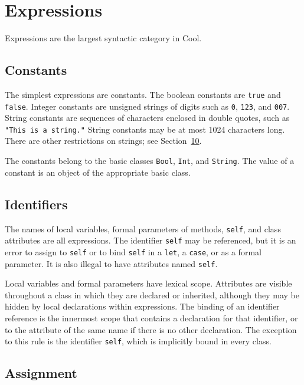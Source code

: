 \documentclass[]{article}
\begin{document}
\section{Expressions}

Expressions are the largest syntactic category in Cool. \\


\subsection{Constants}

The simplest expressions are constants. The boolean constants are
\texttt{true} and \texttt{false}. Integer constants are unsigned strings
of digits such as \texttt{0}, \texttt{123}, and \texttt{007}. String
constants are sequences of characters enclosed in double quotes, such as
\texttt{"This is a string."} String constants may be at most 1024
characters long. There are other restrictions on strings; see
Section~\href{node33.html\#lex-struct}{10}.

The constants belong to the basic classes \texttt{Bool}, \texttt{Int},
and \texttt{String}. The value of a constant is an object of the
appropriate basic class.

\subsection{Identifiers}

The names of local variables, formal parameters of methods,
\texttt{self}, and class attributes are all expressions. The identifier
\texttt{self} may be referenced, but it is an error to assign to
\texttt{self} or to bind \texttt{self} in a \texttt{let}, a
\texttt{case}, or as a formal parameter. It is also illegal to have
attributes named \texttt{self}.

Local variables and formal parameters have lexical scope. Attributes are
visible throughout a class in which they are declared or inherited,
although they may be hidden by local declarations within expressions.
The binding of an identifier reference is the innermost scope that
contains a declaration for that identifier, or to the attribute of the
same name if there is no other declaration. The exception to this rule
is the identifier \texttt{self}, which is implicitly bound in every
class.

\subsection{Assignment}
\end{document}
